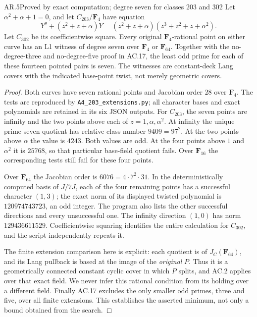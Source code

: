 \begin{claim}{AR.5}{Proved by exact computation; degree seven for classes 203 and 302}
Let $\alpha^2+\alpha+1=0$, and let $C_{203}/\mathbf F_4$ have equation
\[
 Y^2+(z^2+z+\alpha)Y
  =(z^2+z+\alpha)(z^3+z^2+z+\alpha^2).
\]
Let $C_{302}$ be its coefficientwise square.  Every original
$\mathbf F_4$-rational point on either curve has an L1 witness of
degree seven over $\mathbf F_4$ or $\mathbf F_{64}$.
Together with the no-degree-three and no-degree-five proof in AC.17,
the least odd prime for each of these fourteen pointed pairs is seven.
The witnesses are constant-deck Lang covers with the indicated
base-point twist, not merely geometric covers.
\end{claim}
\begin{proof}
Both curves have seven rational points and Jacobian order $28$ over
$\mathbf F_4$.  The tests are reproduced by
\texttt{A4\_203\_extensions.py}; all character bases and exact
polynomials are retained in its six JSON outputs.  For $C_{203}$,
the seven points are infinity and the two points above each of
$z=1,\alpha,\alpha^2$.  At infinity the unique prime-seven quotient
has relative class number $9409=97^2$.  At the two points above
$\alpha$ the value is $4243$.  Both values are odd.  At the four
points above $1$ and $\alpha^2$ it is $25768$, so that particular
base-field quotient fails.  Over $\mathbf F_{16}$ the corresponding
tests still fail for these four points.

Over $\mathbf F_{64}$ the Jacobian order is
$6076=4\cdot7^2\cdot31$.  In the deterministically computed basis
of $J/7J$, each of the four remaining points has a successful
character $(1,3)$; the exact norm of its displayed twisted
polynomial is $120974743723$, an odd integer.  The program also
lists the other successful directions and every unsuccessful one.
The infinity direction $(1,0)$ has norm $129436611529$.
Coefficientwise squaring identifies the entire calculation for
$C_{302}$, and the script independently repeats it.

The finite extension comparison here is explicit: each quotient is
of $J_C(\mathbf F_{64})$, and its Lang pullback is based at the
image of the \emph{original} $P$.  Thus it is a geometrically
connected constant cyclic cover in which $P$ splits, and AC.2
applies over that exact field.  We never infer this rational
condition from its holding over a different field.  Finally AC.17
excludes the only smaller odd primes, three and five, over all
finite extensions.  This establishes the asserted minimum, not
only a bound obtained from the search.
\end{proof}

